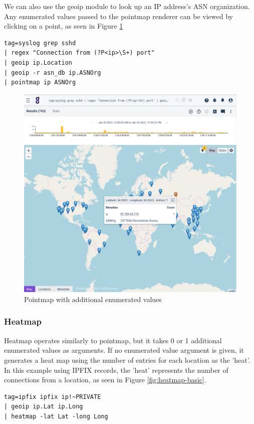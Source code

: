 We can also use the geoip module to look up an IP address's ASN organization. Any enumerated values passed to the pointmap renderer can be viewed by clicking on a point, as seen in Figure \ref{fig:pointmap2}

\begin{Verbatim}[breaklines=true]
tag=syslog grep sshd 
| regex "Connection from (?P<ip>\S+) port" 
| geoip ip.Location 
| geoip -r asn_db ip.ASNOrg 
| pointmap ip ASNOrg
\end{Verbatim}

\begin{figure}
	\includegraphics[width=0.6\linewidth]{images/pointmap2.png}
	\caption{Pointmap with additional enumerated values}
	\label{fig:pointmap2}
\end{figure}


\subsubsection{Heatmap}

Heatmap operates similarly to pointmap, but it takes 0 or 1 additional
enumerated values as arguments. If no enumerated value argument is
given, it generates a heat map using the number of entries for each
location as the 'heat'. In this example using IPFIX records, the
'heat' represents the number of connections from a location, as seen
in Figure \ref{fig:heatmap-basic}.

\begin{Verbatim}[breaklines=true]
tag=ipfix ipfix ip!~PRIVATE 
| geoip ip.Lat ip.Long 
| heatmap -lat Lat -long Long
\end{Verbatim}

